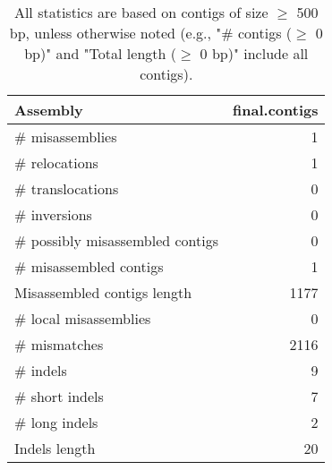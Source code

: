 \documentclass[12pt,a4paper]{article}
\begin{document}
\begin{table}[ht]
\begin{center}
\caption{All statistics are based on contigs of size $\geq$ 500 bp, unless otherwise noted (e.g., "\# contigs ($\geq$ 0 bp)" and "Total length ($\geq$ 0 bp)" include all contigs).}
\begin{tabular}{|l*{1}{|r}|}
\hline
Assembly & final.contigs \\ \hline
\# misassemblies & 1 \\ \hline
\hspace{5mm}\# relocations & 1 \\ \hline
\hspace{5mm}\# translocations & 0 \\ \hline
\hspace{5mm}\# inversions & 0 \\ \hline
\# possibly misassembled contigs & 0 \\ \hline
\# misassembled contigs & 1 \\ \hline
Misassembled contigs length & 1177 \\ \hline
\# local misassemblies & 0 \\ \hline
\# mismatches & 2116 \\ \hline
\# indels & 9 \\ \hline
\hspace{5mm}\# short indels & 7 \\ \hline
\hspace{5mm}\# long indels & 2 \\ \hline
Indels length & 20 \\ \hline
\end{tabular}
\end{center}
\end{table}
\end{document}
